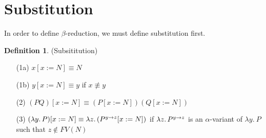 \documentclass[a4paper]{book}
\theoremstyle{definition}
\newtheorem{definition}{Definition}[section]
\begin{document}
\section{Substitution}
In order to define \(\beta\)-reduction, we must define substitution first.
\begin{definition}
  (Subsititution)
  \begin{enumerate}
    \item[(1a)] \(x[x := N] \equiv N\)
    \item[(1b)] \(y[x := N] \equiv y\) if \(x \not\equiv y\)
    \item[(2)]  \((PQ)[x := N] \equiv (P[x := N])(Q[x := N])\)
    \item[(3)]  \((\lambda y\ldotp P)[x := N] \equiv \lambda z\ldotp (P^{y \rightarrow z}[x := N])\) if \(\lambda z\ldotp P^{y \rightarrow z}\)
          is an \(\alpha\)-variant of \(\lambda y.\ P\) such that \(z \notin FV(N)\)
  \end{enumerate}
\end{definition}
\end{document}
